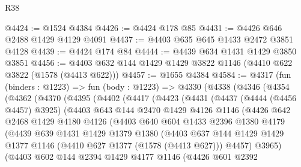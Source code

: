 \begin{lexlean}{R38}
\begin{coremodule}
@4424 := @1524 @4384
@4426 := @4424 @178 @85
@4431 := @4426 @646 @2488 @1429 @4129 @4091
@4437 := @4403 @635 @645 @1433 @2472 @3851 @4128
@4439 := @4424 @174 @84
@4444 := @4439 @634 @1431 @1429 @3850 @3851
@4456 := @4403 @632 @144 @1429 @1429 @3822 @1146 (@4410 @622 @3822 (@1578 (@4413 @622)))
@4457 := @1655 @4384
@4584 := @4317
    (fun (binders : @1223) =>
    fun (body : @1223) =>
    @4330
      (@4338
        (@4346
          (@4354
            (@4362
              (@4370
                (@4395
                  (@4402
                    (@4417
                      (@4423
                        (@4431
                          (@4437
                            (@4444 (@4456 @4457) @3925)
                            (@4403
                              @643
                              @144
                              @2470
                              @1429
                              @4126
                              @1146
                              (@4426
                                @642
                                @2468
                                @1429
                                @4180
                                @4126
                                (@4403
                                  @640
                                  @604
                                  @1433
                                  @2396
                                  @1380
                                  @4179
                                  (@4439
                                    @639
                                    @1431
                                    @1429
                                    @1379
                                    @1380
                                    (@4403
                                      @637
                                      @144
                                      @1429
                                      @1429
                                      @1377
                                      @1146
                                      (@4410 @627 @1377 (@1578 (@4413 @627)))
                                      @4457)
                                    @3965)
                                  (@4403
                                    @602
                                    @144
                                    @2394
                                    @1429
                                    @4177
                                    @1146
                                    (@4426
                                      @601
                                      @2392

\end{coremodule}
\end{lexlean}
